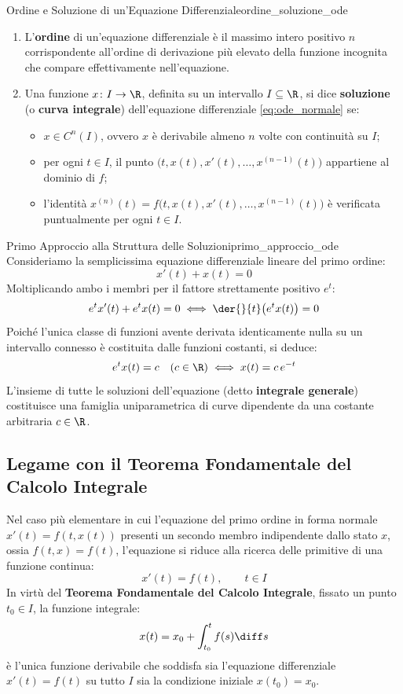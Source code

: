 \begin{definizione}{Ordine e Soluzione di un'Equazione Differenziale}{ordine_soluzione_ode}
\begin{enumerate}
    \item L'\textbf{ordine} di un'equazione differenziale è il massimo intero positivo $n$ corrispondente all'ordine di derivazione più elevato della funzione incognita che compare effettivamente nell'equazione.
    \item Una funzione $x \colon I \to \R$, definita su un intervallo $I \subseteq \R$, si dice \textbf{soluzione} (o \textbf{curva integrale}) dell'equazione differenziale \eqref{eq:ode_normale} se:
    \begin{itemize}
        \item $x \in C^n(I)$, ovvero $x$ è derivabile almeno $n$ volte con continuità su $I$;
        \item per ogni $t \in I$, il punto $\big(t, x(t), x'(t), \dots, x^{(n-1)}(t)\big)$ appartiene al dominio di $f$;
        \item l'identità $x^{(n)}(t) = f\big(t, x(t), x'(t), \dots, x^{(n-1)}(t)\big)$ è verificata puntualmente per ogni $t \in I$.
    \end{itemize}
\end{enumerate}
\end{definizione}

\begin{esempio}{Primo Approccio alla Struttura delle Soluzioni}{primo_approccio_ode}
Consideriamo la semplicissima equazione differenziale lineare del primo ordine:
\[
    x'(t) + x(t) = 0
\]
Moltiplicando ambo i membri per il fattore strettamente positivo $e^t$:
\[
    e^t x'(t) + e^t x(t) = 0 \iff \der{}{t}\big( e^t x(t) \big) = 0
\]
Poiché l'unica classe di funzioni avente derivata identicamente nulla su un intervallo connesso è costituita dalle funzioni costanti, si deduce:
\[
    e^t x(t) = c \quad (c \in \R) \iff x(t) = c\, e^{-t}
\]
L'insieme di tutte le soluzioni dell'equazione (detto \textbf{integrale generale}) costituisce una famiglia uniparametrica di curve dipendente da una costante arbitraria $c \in \R$.
\end{esempio}

\subsection{Legame con il Teorema Fondamentale del Calcolo Integrale}

Nel caso più elementare in cui l'equazione del primo ordine in forma normale $x'(t) = f(t, x(t))$ presenti un secondo membro indipendente dallo stato $x$, ossia $f(t, x) = f(t)$, l'equazione si riduce alla ricerca delle primitive di una funzione continua:
\[
    x'(t) = f(t), \qquad t \in I
\]
In virtù del \textbf{Teorema Fondamentale del Calcolo Integrale}, fissato un punto $t_0 \in I$, la funzione integrale:
\[
    x(t) = x_0 + \int_{t_0}^t f(s) \diff s
\]
è l'unica funzione derivabile che soddisfa sia l'equazione differenziale $x'(t) = f(t)$ su tutto $I$ sia la condizione iniziale $x(t_0) = x_0$.

